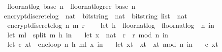\begin{isabellebody}
\ \ {\isachardoublequoteopen}floor{\isacharunderscore}{\kern0pt}nat{\isacharunderscore}{\kern0pt}log\ base\ n\ {\isacharequal}{\kern0pt}\ floor{\isacharunderscore}{\kern0pt}nat{\isacharunderscore}{\kern0pt}log{\isacharunderscore}{\kern0pt}rec\ base\ n\ {}{\isachardoublequoteclose}\ \isanewline
\isanewline
{}\isamarkupfalse%
\ encrypt{\isacharunderscore}{\kern0pt}discrete{\isacharunderscore}{\kern0pt}log\ {\isacharcolon}{\kern0pt}{\isacharcolon}{\kern0pt}\ {\isachardoublequoteopen}nat\ {\isasymRightarrow}\ bitstring\ {\isasymRightarrow}\ nat\ {\isasymRightarrow}\ {\isacharparenleft}{\kern0pt}bitstring\ list\ {\isasymtimes}\ nat{\isacharparenright}{\kern0pt}{\isachardoublequoteclose}\ \isanewline
\ \ {\isachardoublequoteopen}encrypt{\isacharunderscore}{\kern0pt}discrete{\isacharunderscore}{\kern0pt}log\ n\ m\ r\ {\isacharequal}{\kern0pt}\ {\isacharparenleft}{\kern0pt}\isanewline
\ \ let\ h\ {\isacharequal}{\kern0pt}\ {\isacharparenleft}{\kern0pt}floor{\isacharunderscore}{\kern0pt}nat{\isacharunderscore}{\kern0pt}log\ {}\ {\isacharparenleft}{\kern0pt}floor{\isacharunderscore}{\kern0pt}nat{\isacharunderscore}{\kern0pt}log\ {}\ n{\isacharparenright}{\kern0pt}{\isacharparenright}{\kern0pt}\ in\ \isanewline
\ \ let\ m{\isacharunderscore}{\kern0pt}l\ {\isacharequal}{\kern0pt}\ split\ m\ h\ in\ \isanewline
\ \ let\ {\isacharparenleft}{\kern0pt}x{\isacharunderscore}{\kern0pt}{}\ {\isacharcolon}{\kern0pt}{\isacharcolon}{\kern0pt}\ nat{\isacharparenright}{\kern0pt}\ {\isacharequal}{\kern0pt}\ {\isacharparenleft}{\kern0pt}r\ {\isacharasterisk}{\kern0pt}\ r{\isacharparenright}{\kern0pt}\ mod\ n\ in\ \isanewline
\ \ let\ {\isacharparenleft}{\kern0pt}c{\isacharcomma}{\kern0pt}\ x{\isacharunderscore}{\kern0pt}t{\isacharparenright}{\kern0pt}\ {\isacharequal}{\kern0pt}\ enc{\isacharunderscore}{\kern0pt}loop\ {\isacharparenleft}{\kern0pt}n{\isacharcomma}{\kern0pt}\ h{\isacharcomma}{\kern0pt}\ m{\isacharunderscore}{\kern0pt}l{\isacharparenright}{\kern0pt}\ x{\isacharunderscore}{\kern0pt}{}\ in\ \isanewline
\ \ let\ x{\isacharunderscore}{\kern0pt}t{\isacharprime}{\kern0pt}\ {\isacharequal}{\kern0pt}\ x{\isacharunderscore}{\kern0pt}t\ {\isacharasterisk}{\kern0pt}\ x{\isacharunderscore}{\kern0pt}t\ mod\ n\ in\ \isanewline
\ \ {\isacharparenleft}{\kern0pt}c{\isacharcomma}{\kern0pt}\ x{\isacharunderscore}{\kern0pt}t{\isacharprime}{\kern0pt}{\isacharparenright}{\kern0pt}{\isacharparenright}{\kern0pt}{\isachardoublequoteclose}%
\begin{isamarkuptext}%

\end{isamarkuptext}
\end{isabellebody}
